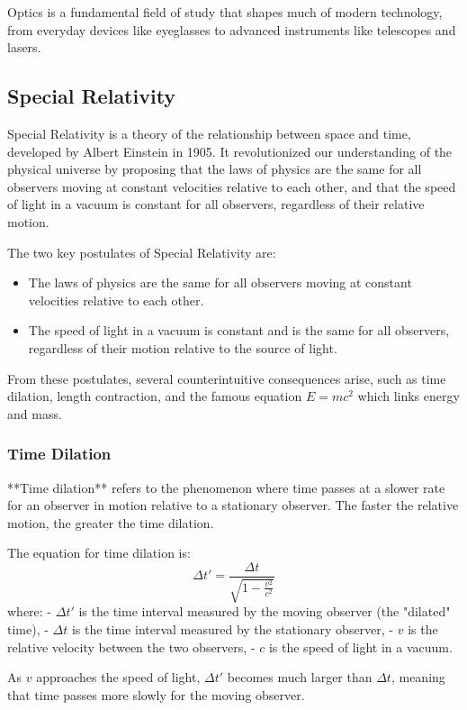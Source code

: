 \documentclass{article}
\begin{document}
Optics is a fundamental field of study that shapes much of modern technology, from everyday devices like eyeglasses to advanced instruments like telescopes and lasers.

\subsection{Special Relativity}

Special Relativity is a theory of the relationship between space and time, developed by Albert Einstein in 1905. It revolutionized our understanding of the physical universe by proposing that the laws of physics are the same for all observers moving at constant velocities relative to each other, and that the speed of light in a vacuum is constant for all observers, regardless of their relative motion.

The two key postulates of Special Relativity are:
\begin{itemize}
    \item The laws of physics are the same for all observers moving at constant velocities relative to each other.
    \item The speed of light in a vacuum is constant and is the same for all observers, regardless of their motion relative to the source of light.
\end{itemize}

From these postulates, several counterintuitive consequences arise, such as time dilation, length contraction, and the famous equation \( E = mc^2 \) which links energy and mass.

\subsubsection*{Time Dilation}

**Time dilation** refers to the phenomenon where time passes at a slower rate for an observer in motion relative to a stationary observer. The faster the relative motion, the greater the time dilation.

The equation for time dilation is:
\[
\Delta t' = \frac{\Delta t}{\sqrt{1 - \frac{v^2}{c^2}}}
\]
where:
- \( \Delta t' \) is the time interval measured by the moving observer (the "dilated" time),
- \( \Delta t \) is the time interval measured by the stationary observer,
- \( v \) is the relative velocity between the two observers,
- \( c \) is the speed of light in a vacuum.

As \( v \) approaches the speed of light, \( \Delta t' \) becomes much larger than \( \Delta t \), meaning that time passes more slowly for the moving observer.
\end{document}
